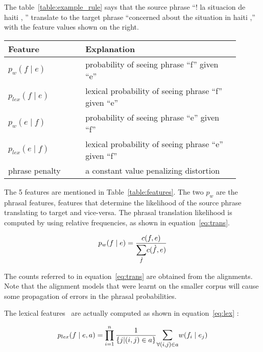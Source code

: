 The table~\ref{table:example_rule}  says that the source phrase ``! la situacion de haiti , '' translate to the target phrase ``concerned about the situation in haiti ,'' with the feature values shown on the right. 

\begin{table*}
	\small
	\small
	\begin{tabular}{p{0.3\linewidth}p{0.6\linewidth}}
	\toprule
	Feature &  Explanation \\
	\toprule
	$p_{w}(f \mid e)$ & probability of seeing phrase ``f'' given ``e'' \\
	$p_{lex}(f \mid e)$ & lexical probability of seeing phrase ``f'' given ``e'' \\
	$p_{w}(e \mid f)$ & probability of seeing phrase ``e'' given ``f'' \\
	$p_{lex}(e \mid f)$ & lexical probability of seeing phrase ``e'' given ``f'' \\
   	phrase penalty & a constant value penalizing distortion \\
	\bottomrule
	\end{tabular}
	\caption{Features of the phrase pairs, where ``f'' is foreign/source \& ``e'' is target/english}
	\label{table:features}
\end{table*}

The 5 features are mentioned in Table~\ref{table:features}. The two $p_{w}$ are the phrasal features, features that determine the likelihood of the source phrase translating to target and vice-versa. The phrasal translation likelihood is computed by using relative frequencies, as shown in equation~\eqref{eq:trans}.

\begin{equation} \label{eq:trans}
	p_{w}(f \mid e) = \frac{c(f, e)}{\mathlarger{\sum\limits_{\grave{f}}}c(\grave{f}, e)}
\end{equation}

The counts referred to in equation~\eqref{eq:trans} are obtained from the alignments. Note that the alignment models that were learnt on the smaller corpus will cause some propagation of errors in the phrasal probabilities. 

The lexical features~\cite{Koehn:03} are actually computed as shown in equation~\eqref{eq:lex} : 

\begin{equation} \label{eq:lex}
	p_{lex}(f \mid e, a) = \prod\limits_{i=1}^{n} \frac{1}{\{j | (i,j) \in a\}}
	\mathlarger{\sum\limits_{\forall (i,j) \in a}} w(f_{i} \mid e_{j})
\end{equation}


